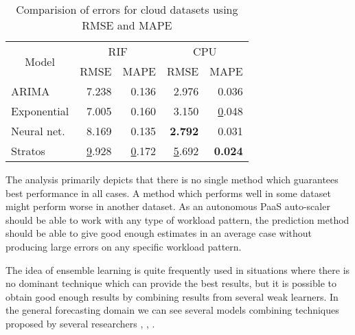 \begin{table}[]
\centering
\caption{Comparision of errors for cloud datasets using RMSE and MAPE}
\label{my-label}
\begin{tabular}{|l|r|r|r|r|}
\hline
\multicolumn{1}{|c|}{\multirow{2}{*}{Model}} & \multicolumn{2}{c|}{RIF}                              & \multicolumn{2}{c|}{CPU}                              \\ \cline{2-5} 
\multicolumn{1}{|c|}{}                       & \multicolumn{1}{c|}{RMSE} & \multicolumn{1}{c|}{MAPE} & \multicolumn{1}{c|}{RMSE} & \multicolumn{1}{c|}{MAPE} \\ \hline
ARIMA                                        & 7.238                     & 0.136                     & 2.976                     & 0.036                     \\ \hline
Exponential                                  & 7.005                     & 0.160                     & 3.150                     & {\ul 0.048}               \\ \hline
Neural net.                                  & 8.169                     & 0.135                     & \textbf{2.792}            & 0.031                     \\ \hline
Stratos                                      & {\ul 9.928}               & {\ul 0.172}               & {\ul 5.692}               & \textbf{0.024}            \\ \hline
\end{tabular}
\end{table}
The analysis primarily depicts that there is no single method which guarantees best performance in all cases. A method which performs well in some dataset might perform worse in another dataset. As an autonomous PaaS auto-scaler should be able to work with any type of workload pattern, the prediction method should be able to give good enough estimates in an average case without producing large errors on any specific workload pattern.

The idea of ensemble learning is quite frequently used in situations where there is no dominant technique which can provide the best results, but it is possible to obtain good enough results by combining results from several weak learners. In the general forecasting domain we can see several models combining techniques proposed by several researchers \cite{Wagner_2011}, \cite{Zhang_2003}, \cite{Zou_2004}.

